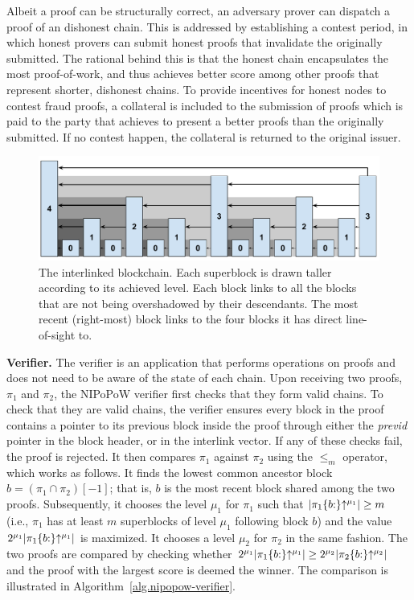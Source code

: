 Albeit a proof can be structurally correct, an adversary prover can dispatch a
proof of an dishonest chain. This is addressed by establishing a contest
period, in which honest provers can submit honest proofs that invalidate
the originally submitted. The rational behind this is that the honest chain
encapsulates the most proof-of-work, and thus achieves better score among
other proofs that represent shorter, dishonest chains. To provide incentives for honest
nodes to contest fraud proofs, a collateral is included to the submission of
proofs which is paid to the party that achieves to present a better proofs than
the originally submitted. If no contest happen, the collateral is returned to
the original issuer.


\begin{figure}[ht]
    \centering
    \includegraphics[width=0.9\columnwidth,keepaspectratio]{figures/prelims/level-shadows.pdf}
    \caption{The interlinked blockchain. Each superblock is drawn taller
    according to its achieved level. Each block links to all the blocks that are
    not being overshadowed by their descendants. The most recent (right-most)
    block links to the four blocks it has direct line-of-sight to.}
    \label{fig.hierarchy}
\end{figure}

\noindent \textbf{Verifier.} The verifier is an application that performs
operations on proofs and does not need to be aware of the state of each chain.
Upon receiving two proofs, $\pi_1$ and $\pi_2$, the NIPoPoW verifier first
checks that they form valid chains. To check that they are valid chains, the
verifier ensures every block in the proof contains a pointer to its previous
block inside the proof through either the \emph{previd} pointer in the block
header, or in the interlink vector. If any of these checks fail, the proof is
rejected.  It then compares $\pi_1$ against $\pi_2$ using the $\leq_m$
operator, which works as follows. It finds the lowest common ancestor block $b
= (\pi_1 \cap \pi_2)[-1]$; that is, $b$ is the most recent block shared among
the two proofs.  Subsequently, it chooses the level $\mu_1$ for $\pi_1$ such
that $\lvert \pi_1\{b{:}\}\negthickspace\uparrow^{\mu_1} \rvert \geq m$ (i.e., $\pi_1$ has at
least $m$ superblocks of level $\mu_1$ following block $b$) and the value
$2^{\mu_1} \lvert \pi_1\{b{:}\}\negthickspace\uparrow^{\mu_1} \rvert$ is maximized.  It
chooses a level $\mu_2$ for $\pi_2$ in the same fashion. The two proofs are
compared by checking whether $2^{\mu_1} \lvert \pi_1\{b{:}\}\negthickspace\uparrow^{\mu_1}
\rvert \geq 2^{\mu_2} \lvert \pi_2\{b{:}\}\negthickspace\uparrow^{\mu_2} \rvert$ and the
proof with the largest score is deemed the winner. The comparison is
illustrated in Algorithm~\ref{alg.nipopow-verifier}.

